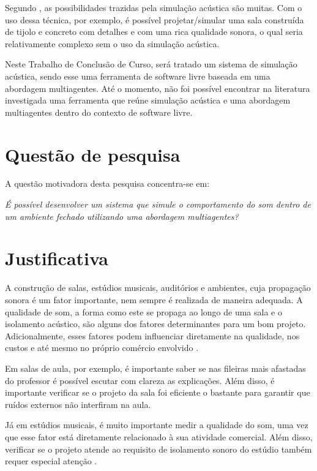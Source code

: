Segundo , as possibilidades trazidas pela simulação acústica são muitas. Com o uso dessa técnica, por exemplo, é possível projetar/simular uma sala construída de tijolo e concreto com detalhes e com uma rica qualidade sonora, o qual seria relativamente complexo sem o uso da simulação acústica.

Neste Trabalho de Conclusão de Curso, será tratado um sistema de simulação acústica, sendo esse uma ferramenta de software livre baseada em uma abordagem multiagentes. Até o momento, não foi possível encontrar na literatura investigada uma ferramenta que reúne simulação acústica e uma abordagem multiagentes dentro do contexto de software livre.

\section{Questão de pesquisa}

A questão motivadora desta pesquisa concentra-se em:

\textit{É possível desenvolver um sistema que simule o comportamento do som dentro de um ambiente fechado utilizando uma abordagem multiagentes?}


\section{Justificativa}

A construção de salas, estúdios musicais, auditórios e ambientes, cuja propagação sonora é um fator importante, nem sempre é realizada de maneira adequada. A qualidade de som, a forma como este se propaga ao longo de uma sala e o isolamento acústico, são alguns dos fatores determinantes para um bom projeto. Adicionalmente, esses fatores podem influenciar diretamente na qualidade, nos custos e até mesmo no próprio comércio envolvido \cite{santos}. 

Em salas de aula, por exemplo, é importante saber se nas fileiras mais afastadas do professor é possível escutar com clareza as explicações. Além disso, é importante verificar se o projeto da sala foi eficiente o bastante para garantir que ruídos externos não interfiram na aula.

Já em estúdios musicais, é muito importante medir a qualidade do som, uma vez que esse fator está diretamente relacionado à sua atividade comercial. Além disso, verificar se o projeto atende ao requisito de isolamento sonoro do estúdio também requer especial atenção \cite{ramires}.

